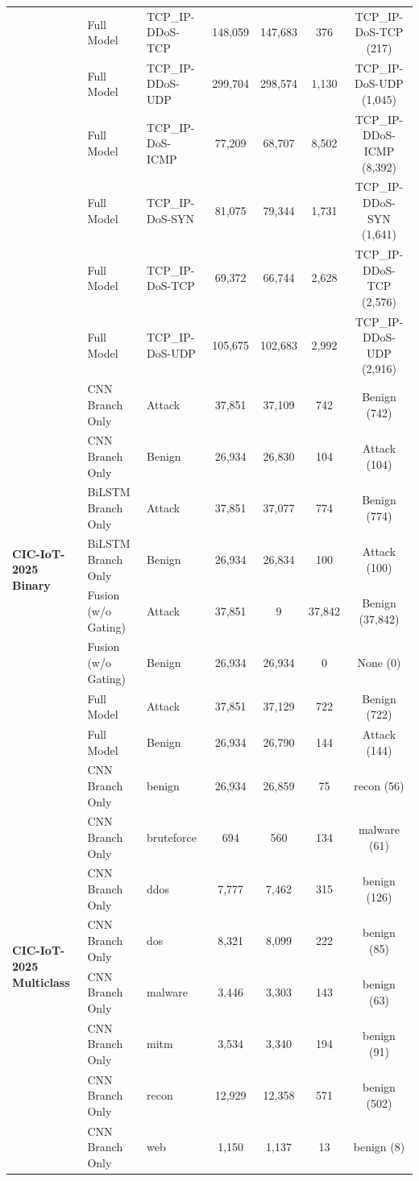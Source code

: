 \documentclass[a4paper,fleqn]{cas-sc}
\begin{document}
\begin{landscape}
\begin{longtable}{lllcccc}
 & Full Model & TCP\_IP-DDoS-TCP & 148,059 & 147,683 & 376 & TCP\_IP-DoS-TCP (217) \\
 & Full Model & TCP\_IP-DDoS-UDP & 299,704 & 298,574 & 1,130 & TCP\_IP-DoS-UDP (1,045) \\
 & Full Model & TCP\_IP-DoS-ICMP & 77,209 & 68,707 & 8,502 & TCP\_IP-DDoS-ICMP (8,392) \\
 & Full Model & TCP\_IP-DoS-SYN & 81,075 & 79,344 & 1,731 & TCP\_IP-DDoS-SYN (1,641) \\
 & Full Model & TCP\_IP-DoS-TCP & 69,372 & 66,744 & 2,628 & TCP\_IP-DDoS-TCP (2,576) \\
 & Full Model & TCP\_IP-DoS-UDP & 105,675 & 102,683 & 2,992 & TCP\_IP-DDoS-UDP (2,916) \\
\midrule
\multirow{8}{*}{\textbf{CIC-IoT-2025 Binary}} & CNN Branch Only & Attack & 37,851 & 37,109 & 742 & Benign (742) \\
 & CNN Branch Only & Benign & 26,934 & 26,830 & 104 & Attack (104) \\
 & BiLSTM Branch Only & Attack & 37,851 & 37,077 & 774 & Benign (774) \\
 & BiLSTM Branch Only & Benign & 26,934 & 26,834 & 100 & Attack (100) \\
 & Fusion (w/o Gating) & Attack & 37,851 & 9 & 37,842 & Benign (37,842) \\
 & Fusion (w/o Gating) & Benign & 26,934 & 26,934 & 0 & None (0) \\
 & Full Model & Attack & 37,851 & 37,129 & 722 & Benign (722) \\
 & Full Model & Benign & 26,934 & 26,790 & 144 & Attack (144) \\
\midrule
\multirow{32}{*}{\textbf{CIC-IoT-2025 Multiclass}} & CNN Branch Only & benign & 26,934 & 26,859 & 75 & recon (56) \\
 & CNN Branch Only & bruteforce & 694 & 560 & 134 & malware (61) \\
 & CNN Branch Only & ddos & 7,777 & 7,462 & 315 & benign (126) \\
 & CNN Branch Only & dos & 8,321 & 8,099 & 222 & benign (85) \\
 & CNN Branch Only & malware & 3,446 & 3,303 & 143 & benign (63) \\
 & CNN Branch Only & mitm & 3,534 & 3,340 & 194 & benign (91) \\
 & CNN Branch Only & recon & 12,929 & 12,358 & 571 & benign (502) \\
 & CNN Branch Only & web & 1,150 & 1,137 & 13 & benign (8) \\

\end{longtable}
\end{landscape}
\end{document}
